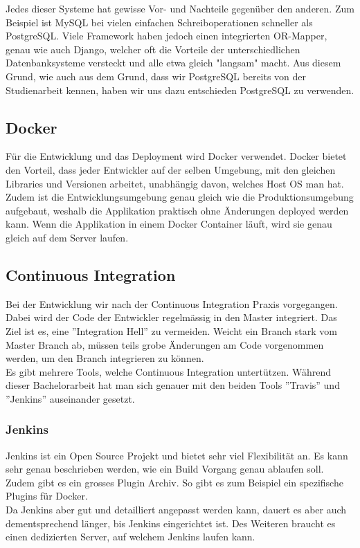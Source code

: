 \noindent Jedes dieser Systeme hat gewisse Vor- und Nachteile gegenüber den anderen. Zum Beispiel ist MySQL bei vielen einfachen Schreiboperationen schneller als PostgreSQL. Viele Framework haben jedoch einen integrierten OR-Mapper, genau wie auch Django, welcher oft die Vorteile der unterschiedlichen Datenbanksysteme versteckt und alle etwa gleich "langsam" macht. Aus diesem Grund, wie auch aus dem Grund, dass wir PostgreSQL bereits von der Studienarbeit kennen, haben wir uns dazu entschieden PostgreSQL zu verwenden. 


\subsection{Docker}
Für die Entwicklung und das Deployment wird Docker verwendet. Docker bietet den Vorteil, dass jeder Entwickler auf der selben Umgebung, mit den gleichen Libraries und Versionen arbeitet, unabhängig davon, welches Host OS man hat. Zudem ist die Entwicklungsumgebung genau gleich wie die Produktionsumgebung aufgebaut, weshalb die Applikation praktisch ohne Änderungen deployed werden kann. Wenn die Applikation in einem Docker Container läuft, wird sie genau gleich auf dem Server laufen.


\subsection{Continuous Integration}
Bei der Entwicklung wir nach der Continuous Integration Praxis vorgegangen. Dabei wird der Code der Entwickler regelmässig in den Master integriert. Das Ziel ist es, eine ''Integration Hell'' zu vermeiden. Weicht ein Branch stark vom Master Branch ab, müssen teils grobe Änderungen am Code vorgenommen werden, um den Branch integrieren zu können.
\\
Es gibt mehrere Tools, welche Continuous Integration untertützen. Während dieser Bachelorarbeit hat man sich genauer mit den beiden Tools ''Travis'' und ''Jenkins'' auseinander gesetzt.

\subsubsection{Jenkins}
Jenkins ist ein Open Source Projekt und bietet sehr viel Flexibilität an. Es kann sehr genau beschrieben werden, wie ein Build Vorgang genau ablaufen soll. Zudem gibt es ein grosses Plugin Archiv. So gibt es zum Beispiel ein spezifische Plugins für Docker.
\\
Da Jenkins aber gut und detailliert angepasst werden kann, dauert es aber auch dementsprechend länger, bis Jenkins eingerichtet ist. Des Weiteren braucht es einen dedizierten Server, auf welchem Jenkins laufen kann.

